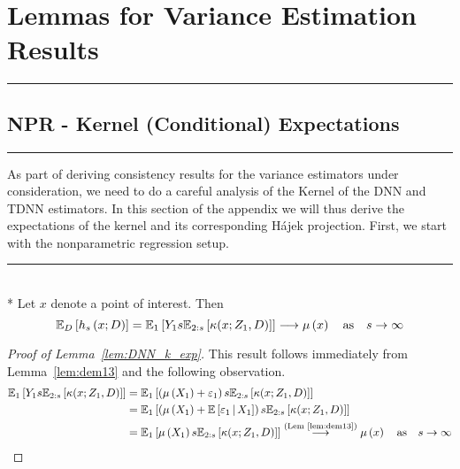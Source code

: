 \section{Lemmas for Variance Estimation Results}
\hrule

\subsection{NPR - Kernel (Conditional) Expectations}\label{subsec:KernelCondExp}
\hrule
As part of deriving consistency results for the variance estimators under consideration, we need to do a careful analysis of the Kernel of the DNN and TDNN estimators.
In this section of the appendix we will thus derive the expectations of the kernel and its corresponding H\'ajek projection.
First, we start with the nonparametric regression setup.
\vspace{0.5cm}
\hrule

\begin{boxD}
    \begin{lem}\label{lem:DNN_k_exp}\mbox{}\\*
	Let $x$ denote a point of interest.
	Then
	\begin{equation}
		\mathbb{E}_D\left[h_s\left(x; D\right)\right]
		= \mathbb{E}_{1}\left[Y_1 s \mathbb{E}_{2:s}\left[\kappa(x; Z_1, D)\right]\right]
		  \longrightarrow \mu\left(x\right) \quad \text{as} \quad s \rightarrow \infty
	\end{equation}
\end{lem}
\end{boxD}

\begin{proof}[Proof of Lemma~\ref{lem:DNN_k_exp}]
	This result follows immediately from Lemma~\ref{lem:dem13} and the following observation.
    \begin{equation}
		\begin{aligned}
			\mathbb{E}_{1}\left[Y_1 s \mathbb{E}_{2:s}\left[\kappa(x; Z_1, D)\right]\right]
			 & = \mathbb{E}_{1}\left[\left(\mu\left(X_1\right) + \varepsilon_1\right) s \mathbb{E}_{2:s}\left[\kappa(x; Z_1, D)\right]\right]                                   \\
			 & = \mathbb{E}_{1}\left[\left(\mu\left(X_1\right) + \mathbb{E}\left[\varepsilon_1 \, \middle| \, X_1\right]\right) s \mathbb{E}_{2:s}\left[\kappa(x; Z_1, D)\right]\right] \\
			 & = \mathbb{E}_{1}\left[\mu\left(X_1\right) s \mathbb{E}_{2:s}\left[\kappa(x; Z_1, D)\right]\right]
			\overset{\text{(Lem~\ref{lem:dem13})}}{\longrightarrow} \mu\left(x\right)
			\quad \text{as} \quad s \rightarrow \infty
		\end{aligned}
	\end{equation}
\end{proof}

